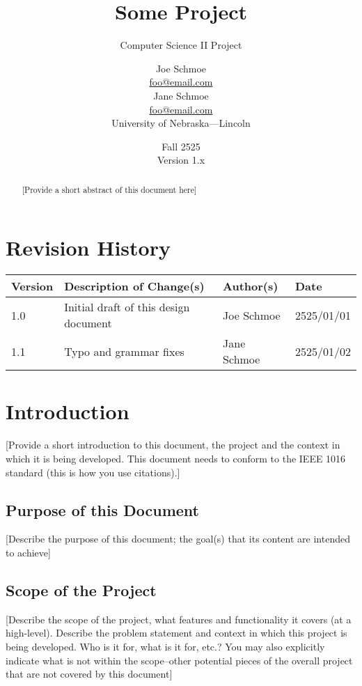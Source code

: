 \documentclass[12pt]{scrartcl} %
\title{Some Project}
\subtitle{Computer Science II Project}
\author{Joe Schmoe\\
        \href{mailto:foo@email.com}{foo@email.com} \\
        Jane Schmoe\\
        \href{mailto:foo@email.com}{foo@email.com} \\        
        University of Nebraska---Lincoln\\
}
\date{Fall 2525 \\
      Version 1.x
}
\begin{document}
\maketitle
\thispagestyle{empty}

\vfill

\begin{abstract}
[Provide a short abstract of this document here]
\end{abstract}

\newpage
\clearpage
\setcounter{page}{1}
\section*{Revision History}

\begin{tabular}{|l|l|l|l|}
\hline
Version & Description of Change(s) & Author(s) & Date \\
\hline
1.0 & Initial draft of this design document & Joe Schmoe & 2525/01/01 \\
\hline
1.1 & Typo and grammar fixes & Jane Schmoe & 2525/01/02 \\
\hline
\end{tabular}

\newpage
\tableofcontents

\newpage
\section{Introduction}

[Provide a short introduction to this document, the project and the context in which it is being developed.  This document needs to conform to the 
IEEE 1016 standard \cite{IEEE1016} (this is how you use citations).]

\subsection{Purpose of this Document}

[Describe the purpose of this document; the goal(s) that its content are intended to achieve]

\subsection{Scope of the Project}

[Describe the scope of the project, what features and functionality it covers (at a high-level).  Describe the problem statement and context in which this project is being developed.  Who is it for, what is it for, etc.?  You may also explicitly indicate what is not within the scope--other potential pieces of the overall project that are not covered by this document]
\end{document}
